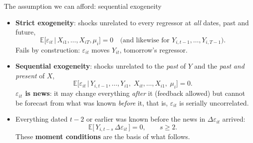 \documentclass[
  11pt,
  ignorenonframetext,
  aspectratio=169,
]{beamer}
\begin{document}
\begin{frame}{The assumption we can afford: sequential exogeneity}
\protect{}\label{the-assumption-we-can-afford-sequential-exogeneity}
\begin{itemize}
\item
  \textbf{Strict exogeneity}: shocks unrelated to every regressor at
  \emph{all} dates, past and future, \[
  \mathbb{E}\big[\varepsilon_{it} \,\big|\, X_{i1}, \dots, X_{iT}, \mu_i\big] = 0 \quad \text{(and likewise for } Y_{i,t-1}, \dots, Y_{i,T-1}).
  \] Fails by construction: \(\varepsilon_{it}\) moves \(Y_{it}\),
  tomorrow's regressor.
\item
  \textbf{Sequential exogeneity}: shocks unrelated to the \emph{past} of
  \(Y\) and the \emph{past and present} of \(X\), \[
  \mathbb{E}\big[\varepsilon_{it} \,\big|\, Y_{i,t-1}, \dots, Y_{i1},\; X_{it}, \dots, X_{i1},\; \mu_i\big] = 0.
  \] \textbf{\(\varepsilon_{it}\) is news}: it may change everything
  \emph{after} it (feedback allowed) but cannot be forecast from what
  was known \emph{before} it, that is, \(\varepsilon_{it}\) is serially
  uncorrelated.
\item
  Everything dated \(t-2\) or earlier was known before the news in
  \(\Delta\varepsilon_{it}\) arrived: \[
  \mathbb{E}\big[\,Y_{i,t-s}\,\Delta\varepsilon_{it}\,\big] = 0, \qquad s \ge 2.
  \] These \textbf{moment conditions} are the basis of what follows.
\end{itemize}
\end{frame}
\end{document}
